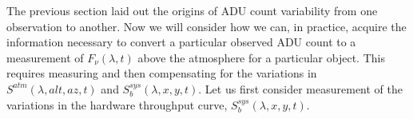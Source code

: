 \documentclass[12pt,preprint]{aastex}
\begin{document}
The previous section laid out the origins of ADU count variability
from one observation to another. Now we will consider how we can, in
practice, acquire the information necessary to convert a particular
observed ADU count to a measurement of $F_\nu(\lambda,t)$ above the
atmosphere for a particular object.  This requires measuring and then 
compensating for the variations in
$S^{atm}(\lambda,alt,az,t)$ and $S_b^{sys}(\lambda,x,y,t)$.
Let us first consider measurement of the variations in the hardware
throughput curve, $S_b^{sys}(\lambda,x,y,t)$. 


\end{document}
